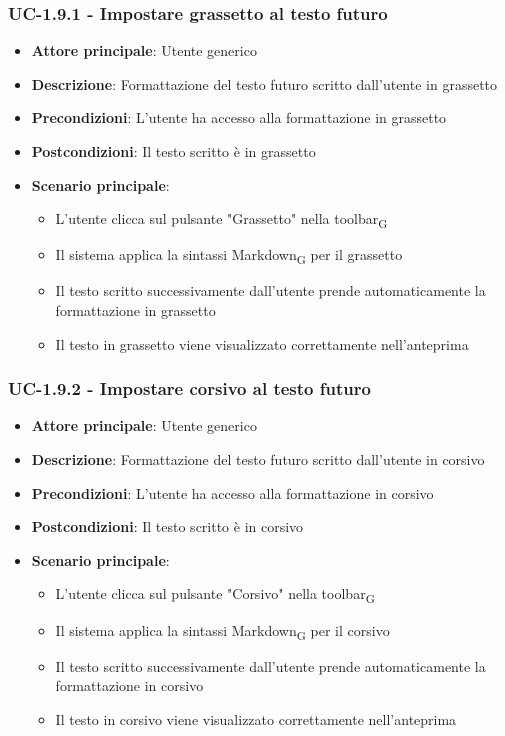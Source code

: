\documentclass[11pt,a4paper]{article}
\newcommand{\gls}[1]{#1\textsubscript{G}}
\begin{document}
\subsubsection{UC-1.9.1 - Impostare grassetto al testo futuro}
\begin{itemize}
    \item \textbf{Attore principale}: Utente generico
    \item \textbf{Descrizione}: Formattazione del testo futuro scritto dall’utente in grassetto
    \item \textbf{Precondizioni}: L’utente ha accesso alla formattazione in grassetto
    \item \textbf{Postcondizioni}: Il testo scritto è in grassetto
    \item \textbf{Scenario principale}:
        \begin{itemize}
            \item L’utente clicca sul pulsante "Grassetto" nella \gls{toolbar}
            \item Il sistema applica la sintassi \gls{Markdown} per il grassetto
            \item Il testo scritto successivamente dall'utente prende automaticamente la formattazione in grassetto
            \item Il testo in grassetto viene visualizzato correttamente nell'anteprima
        \end{itemize}
\end{itemize}

\subsubsection{UC-1.9.2 - Impostare corsivo al testo futuro}
\begin{itemize}
    \item \textbf{Attore principale}: Utente generico
    \item \textbf{Descrizione}: Formattazione del testo futuro scritto dall’utente in corsivo
    \item \textbf{Precondizioni}: L’utente ha accesso alla formattazione in corsivo
    \item \textbf{Postcondizioni}: Il testo scritto è in corsivo
    \item \textbf{Scenario principale}:
        \begin{itemize}
            \item L’utente clicca sul pulsante "Corsivo" nella \gls{toolbar}
            \item Il sistema applica la sintassi \gls{Markdown} per il corsivo
            \item Il testo scritto successivamente dall'utente prende automaticamente la formattazione in corsivo
            \item Il testo in corsivo viene visualizzato correttamente nell'anteprima
        \end{itemize}
\end{itemize}
\end{document}
